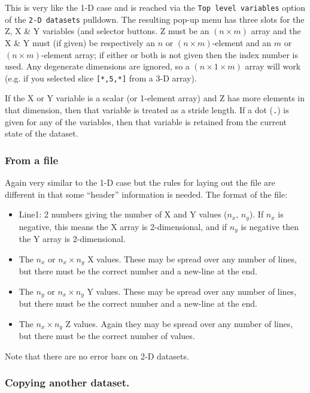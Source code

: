 \documentclass[11pt,twoside,english]{article}
\begin{document}
This is very like the 1-D case and is reached via the \texttt{Top level
  variables} option of the \texttt{2-D datasets} pulldown. The
resulting pop-up menu has three slots for the Z, X \& Y variables (and
selector buttons.  Z must be an $(n\times m)$ array and the X \& Y must
(if given) be respectively an $n$ or $(n\times m)$-element and an $m$
or $(n\times m)$-element array; if either or both is not given then the
index number is used. Any degenerate dimensions are ignored, so a
$(n\times 1 \times m)$ array will work (e.g. if you selected slice
\texttt{[*,5,*]} from a 3-D array).

If the X or Y variable is a scalar (or 1-element array) and Z has more
elements in that dimension, then that variable is treated as a stride
length. If a dot (\texttt{.}) is given for any of the variables, then
that variable is retained from the current state of the dataset.

\subsubsection{From a file}

Again very similar to the 1-D case but the rules for laying out the
file are different in that some {}``header'' information is needed.
The format of the file:

\begin{itemize}
\item Line1: 2 numbers giving the number of X and Y values ($n_{x},\,
  n_{y}$). If $n_x$ is negative, this means the X array is
  2-dimensional, and if $n_y$ is negative then the Y array is
  2-dimensional.
\item The $n_{x}$ or $n_x \times n_y$ X values. These may be spread
  over any number of lines, but there must be the correct number and a
  new-line at the end.
\item The $n_{y}$ or $n_x \times n_y$ Y values. These may be spread
  over any number of lines, but there must be the correct number and a
  new-line at the end.
\item The $n_{x}\times n_{y}$ Z values. Again they may be spread over
  any number of lines, but there must be the correct number of values.
\end{itemize}
Note that there are no error bars on 2-D datasets.

\subsubsection{Copying another dataset.}
\label{sec:zcopy}
\end{document}
